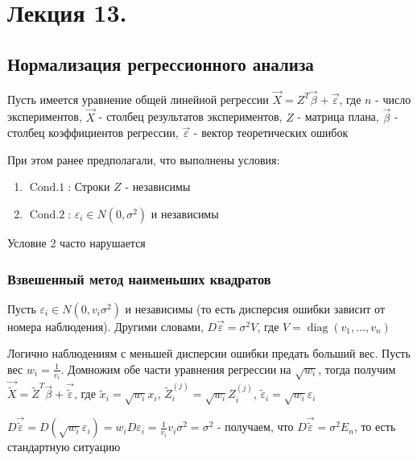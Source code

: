 \documentclass[12pt]{article}
\begin{document}





\section{Лекция 13.}

\subsection{Нормализация регрессионного анализа}

Пусть имеется уравнение общей линейной регрессии $\vec X = Z^T \vec \beta + \vec \varepsilon$, где $n$ - число экспериментов, $\vec X$ - столбец результатов экспериментов, $Z$ - матрица плана, $\vec \beta$ - столбец коэффициентов регрессии, $\vec \varepsilon$ - вектор теоретических ошибок

При этом ранее предполагали, что выполнены условия:

\begin{enumerate}
    \item $\operatorname{Cond. 1}$: Строки $Z$ - независимы
    \item $\operatorname{Cond. 2}$: $\varepsilon_i \in N(0, \sigma^2)$ и независимы
\end{enumerate}

Условие 2 часто нарушается

\hypertarget{weighted_mls}{}

\subsubsection{Взвешенный метод наименьших квадратов}

Пусть $\varepsilon_i \in N(0, v_i \sigma^2)$ и независимы (то есть дисперсия ошибки зависит от номера наблюдения). Другими словами, $D \vec \varepsilon = \sigma^2 V$, где $V = \operatorname{diag} (v_1, \dots, v_n)$

Логично наблюдениям с меньшей дисперсии ошибки предать больший вес. Пусть вес $w_i = \frac{1}{v_i}$. Домножим обе части уравнения регрессии на $\sqrt{w_i}$, тогда получим $\vec \tilde{X} = \tilde Z^T \vec \beta + \vec \tilde{\varepsilon}$, где $\tilde x_i=  \sqrt{w_i} x_i$, $\tilde Z^{(j)}_i = \sqrt{w_i} Z^{(j)}_i$, $\tilde \varepsilon_i = \sqrt{w_i} \varepsilon_i$

$D \vec \tilde{\varepsilon} = D(\sqrt{w_i} \varepsilon_i) = w_i D \varepsilon_i = \frac{1}{v_i} v_i \sigma^2 = \sigma^2$ - получаем, что $D \vec \tilde{\varepsilon} = \sigma^2 E_n$, то есть стандартную ситуацию
\end{document}
